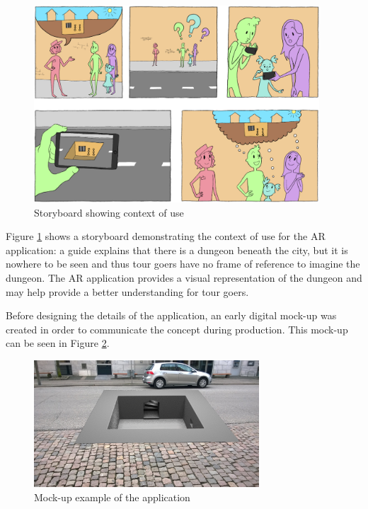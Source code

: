 \begin{figure}[h!]
   \centering
   \includegraphics[width=0.95\textwidth]{figures/storyboard.jpg}
   \caption{Storyboard showing context of use}\label{fig:storyboard}
\end{figure}

Figure \ref{fig:storyboard} shows a storyboard demonstrating the context of use for the AR application: a guide explains that there is a dungeon beneath the city, but it is nowhere to be seen and thus tour goers have no frame of reference to imagine the dungeon. The AR application provides a visual representation of the dungeon and may help provide a better understanding for tour goers.

Before designing the details of the application, an early digital mock-up was created in order to communicate the concept during production. This mock-up can be seen in Figure \ref{fig:mockup}.

\begin{figure}[h!]
   \centering
   \includegraphics[width=0.75\textwidth]{figures/mockup.png}
   \caption{Mock-up example of the application}\label{fig:mockup}
\end{figure}

